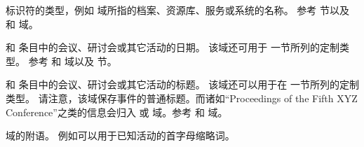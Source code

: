\begin{fieldlist}

 标识符的类型，例如  域所指的档案、资源库、服务或系统的名称。
参考  节以及  和  域。




 和  条目中的会议、研讨会或其它活动的日期。
该域还可用于  一节所列的定制类型。
参考  和  域以及  节。




 和  条目中的会议、研讨会或其它活动的标题。
该域还可以用于在  一节所列的定制类型。
请注意，该域保存事件的普通标题。而诸如“Proceedings of the Fifth XYZ Conference”之类的信息会归入  或  域。参考  和  域。




 域的附语。
例如可以用于已知活动的首字母缩略词。




\end{fieldlist}
